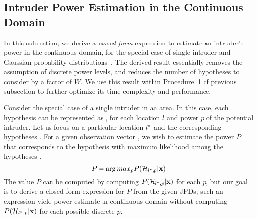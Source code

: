 \subsection{Intruder Power Estimation in the Continuous Domain}
\label{sec:ipsn-power}

In this subsection, we derive a {\em closed-form} expression to estimate an
intruder's power in the continuous domain, for the special case of
single intruder and Gaussian probability
distributions~\cite{gauss}. The derived result essentially removes the
assumption of discrete power levels, and reduces the number of
hypotheses to consider by a factor of $W$. We use
this result within Procedure~1 of previous subsection to further
optimize its time complexity and performance.

  Consider the
special case of a single intruder in an area. In this case, each
hypothesis can be represented as \hlp, for each location $l$ and power
$p$ of the potential intruder. Let us focus on a particular location
$l^*$ and the corresponding hypotheses \hLp. 
For a given observation vector \vx, we wish to estimate the power $P$
that corresponds to the hypothesis with maximum likelihood among the
hypotheses \hLp.
$$P = \arg max_p P(\mathcal{H}_{l^*,p} | \mathbf{x})$$
The value $P$ can be computed by computing $P(\mathcal{H}_{l^*,p} | \mathbf{x})$ for
each $p$, but our goal is to derive a closed-form expression for $P$
from the given JPDs; such an expression yield power estimate in
continuous domain without computing $P(\mathcal{H}_{l^*,p} | \mathbf{x})$ for each possible
discrete $p$.

